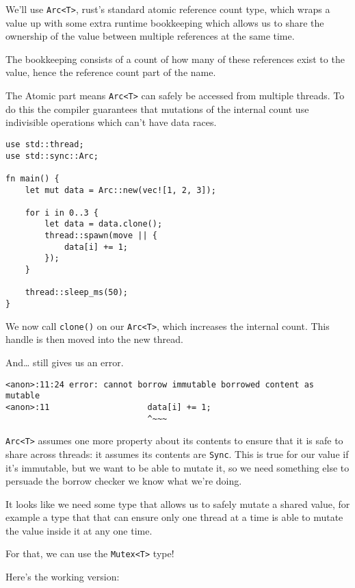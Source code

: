 \documentclass[a4paper,]{book}
\begin{document}
We'll use \texttt{Arc\textless{}T\textgreater{}}, rust's standard atomic
reference count type, which wraps a value up with some extra runtime
bookkeeping which allows us to share the ownership of the value between
multiple references at the same time.

The bookkeeping consists of a count of how many of these references
exist to the value, hence the reference count part of the name.

The Atomic part means \texttt{Arc\textless{}T\textgreater{}} can safely
be accessed from multiple threads. To do this the compiler guarantees
that mutations of the internal count use indivisible operations which
can't have data races.

\begin{verbatim}
use std::thread;
use std::sync::Arc;

fn main() {
    let mut data = Arc::new(vec![1, 2, 3]);

    for i in 0..3 {
        let data = data.clone();
        thread::spawn(move || {
            data[i] += 1;
        });
    }

    thread::sleep_ms(50);
}
\end{verbatim}

We now call \texttt{clone()} on our
\texttt{Arc\textless{}T\textgreater{}}, which increases the internal
count. This handle is then moved into the new thread.

And\ldots{} still gives us an error.

\begin{verbatim}
<anon>:11:24 error: cannot borrow immutable borrowed content as mutable
<anon>:11                    data[i] += 1;
                             ^~~~
\end{verbatim}

\texttt{Arc\textless{}T\textgreater{}} assumes one more property about
its contents to ensure that it is safe to share across threads: it
assumes its contents are \texttt{Sync}. This is true for our value if
it's immutable, but we want to be able to mutate it, so we need
something else to persuade the borrow checker we know what we're doing.

It looks like we need some type that allows us to safely mutate a shared
value, for example a type that that can ensure only one thread at a time
is able to mutate the value inside it at any one time.

For that, we can use the \texttt{Mutex\textless{}T\textgreater{}} type!

Here's the working version:
\end{document}
